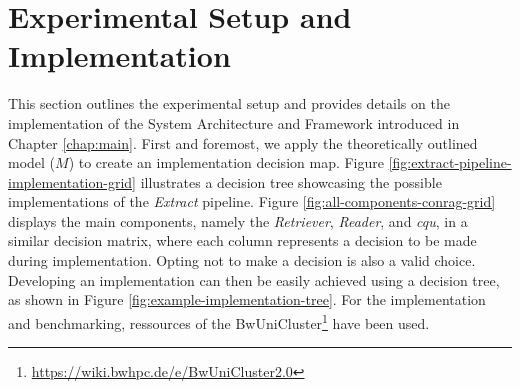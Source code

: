 

\section{Experimental Setup and Implementation}
\label{sec:setup}

This section outlines the experimental setup and provides details on the implementation of the System Architecture and Framework introduced in Chapter \ref{chap:main}. First and foremost, we apply the theoretically outlined model ($M$) to create an implementation decision map. Figure \ref{fig:extract-pipeline-implementation-grid} illustrates a decision tree showcasing the possible implementations of the \textit{Extract} pipeline. Figure \ref{fig:all-components-conrag-grid} displays the main components, namely the \textit{Retriever}, \textit{Reader}, and \textit{\gls{cqu}}, in a similar decision matrix, where each column represents a decision to be made during implementation. Opting not to make a decision is also a valid choice. Developing an implementation can then be easily achieved using a decision tree, as shown in Figure \ref{fig:example-implementation-tree}. For the implementation and benchmarking, ressources of the BwUniCluster\footnote{\url{https://wiki.bwhpc.de/e/BwUniCluster2.0}} have been used.

